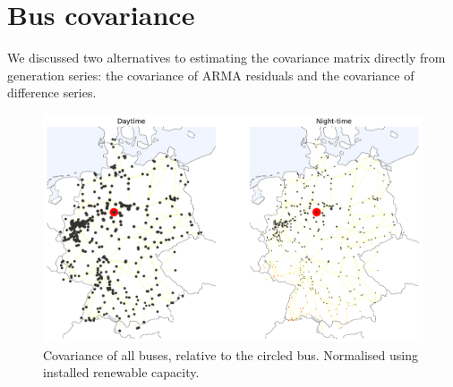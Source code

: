 \documentclass[main.tex]{subfiles}
\begin{document}
\section{Bus covariance}
We discussed two alternatives to estimating the covariance matrix directly from generation series: the covariance of ARMA residuals and the covariance of difference series. 
\begin{figure}[ht]
    \centering
    \includegraphics[width=\textwidth]{img/bus_correlation_123_fullcov_day_and_night.pdf}
    \caption{
    \label{fig:buscov}Covariance of all buses, relative to the circled bus. Normalised using installed renewable capacity.}
\end{figure}
\end{document}
